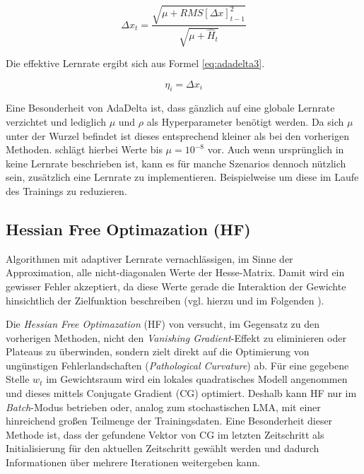 \begin{equation}
\label{eq:adadelta1} 
\Delta x_{t} = \frac{\sqrt{\mu + RMS[\Delta x]^2_{t-1} }}{\sqrt{\mu + \hat{H}_{t}}} 
\end{equation}

Die effektive Lernrate ergibt sich aus Formel \ref{eq:adadelta3}.

\begin{equation}
\label{eq:adadelta3} 
 \eta_{i} = \Delta x_i
\end{equation}

Eine Besonderheit von AdaDelta ist, dass gänzlich auf eine globale Lernrate verzichtet und lediglich $\mu$ und $\rho$ als Hyperparameter benötigt werden. Da sich $\mu$ unter der Wurzel befindet ist dieses entsprechend kleiner als bei den vorherigen Methoden. \cite{Zeiler2012} schlägt hierbei Werte bis $\mu = 10^{-8}$ vor. Auch wenn ursprünglich in \cite{Zeiler2012} keine Lernrate beschrieben ist, kann es für manche Szenarios dennoch nützlich sein, zusätzlich eine Lernrate zu implementieren. Beispielweise um diese im Laufe des Trainings zu reduzieren.


\subsection{Hessian Free Optimazation (HF)}
\label{ch:hf}

Algorithmen mit adaptiver Lernrate vernachlässigen, im Sinne der Approximation, alle nicht-diagonalen Werte der Hesse-Matrix. Damit wird ein gewisser Fehler akzeptiert, da diese Werte gerade die Interaktion der Gewichte hinsichtlich der Zielfunktion beschreiben (vgl. hierzu und im Folgenden \cite{Martens2010}). 

Die \textit{Hessian Free Optimazation} (HF) von \cite{Martens2010} versucht, im Gegensatz zu den vorherigen Methoden, nicht den \textit{Vanishing Gradient}-Effekt zu eliminieren oder Plateaus zu überwinden, sondern zielt direkt auf die Optimierung von ungünstigen Fehlerlandschaften (\textit{Pathological Curvature}) ab.
Für eine gegebene Stelle $w_t$ im Gewichtsraum wird ein lokales quadratisches Modell angenommen und dieses mittels Conjugate  Gradient (CG) optimiert. Deshalb kann HF nur im \textit{Batch}-Modus betrieben oder, analog zum stochastischen LMA, mit einer hinreichend großen Teilmenge der Trainingsdaten. Eine Besonderheit dieser Methode ist, dass der gefundene Vektor von CG im letzten Zeitschritt als Initialisierung für den aktuellen Zeitschritt gewählt werden und dadurch Informationen über mehrere Iterationen weitergeben kann.

